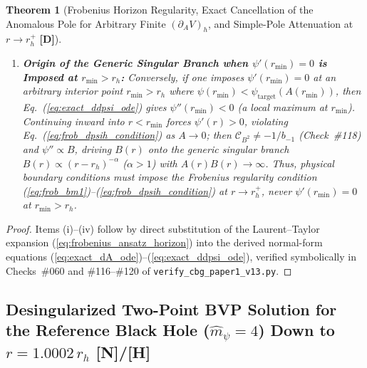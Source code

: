 \documentclass[11pt,a4paper]{article}
\newcommand{\catD}{\textbf{\textcolor{blue!75!black}{[D]}}}
\newcommand{\catH}{\textbf{\textcolor{orange!85!black}{[H]}}}
\newcommand{\catN}{\textbf{\textcolor{teal!75!black}{[N]}}}
\newtheorem{theorem}{Theorem}[section]
\theoremstyle{definition}
\theoremstyle{remark}
\begin{document}
\begin{theorem}[Frobenius Horizon Regularity, Exact Cancellation of the Anomalous Pole for Arbitrary Finite $(\partial_A V)_h$, and Simple-Pole Attenuation at $r \to r_h^+$ \catD]
\begin{enumerate}
  \item[\textnormal{(iv)}] \textbf{Origin of the Generic Singular Branch when $\psi'(r_{\min}) = 0$ is Imposed at $r_{\min} > r_h$:} Conversely, if one imposes $\psi'(r_{\min}) = 0$ at an arbitrary interior point $r_{\min} > r_h$ where $\psi(r_{\min}) < \psi_{\text{target}}(A(r_{\min}))$, then Eq.~(\ref{eq:exact_ddpsi_ode}) gives $\psi''(r_{\min}) < 0$ (a local maximum at $r_{\min}$). Continuing inward into $r < r_{\min}$ forces $\psi'(r) > 0$, violating Eq.~(\ref{eq:frob_dpsih_condition}) as $A \to 0$; then $\mathcal{C}_{B^2} \neq -1/b_{-1}$ (Check~\#118) and $\psi'' \propto B$, driving $B(r)$ onto the generic singular branch $B(r) \propto (r - r_h)^{-\alpha}$ ($\alpha > 1$) with $A(r)B(r) \to \infty$. Thus, physical boundary conditions must impose the Frobenius regularity condition (\ref{eq:frob_bm1})--(\ref{eq:frob_dpsih_condition}) at $r \to r_h^+$, never $\psi'(r_{\min}) = 0$ at $r_{\min} > r_h$.
\end{enumerate}
\end{theorem}

\begin{proof}
Items (i)--(iv) follow by direct substitution of the Laurent--Taylor expansion (\ref{eq:frobenius_ansatz_horizon}) into the derived normal-form equations (\ref{eq:exact_dA_ode})--(\ref{eq:exact_ddpsi_ode}), verified symbolically in Checks~\#060 and \#116--\#120 of \allowbreak\texttt{verify\_cbg\_paper1\_v13.py}.
\end{proof}

\subsection{\texorpdfstring{Desingularized Two-Point BVP Solution for the Reference Black Hole ($\hat{m}_{\psi} = 4$) Down to $r = 1.0002\,r_h$ \catN/\catH}{Desingularized Two-Point BVP Solution for the Reference Black Hole Down to r = 1.0002 r_h}}
\end{document}
